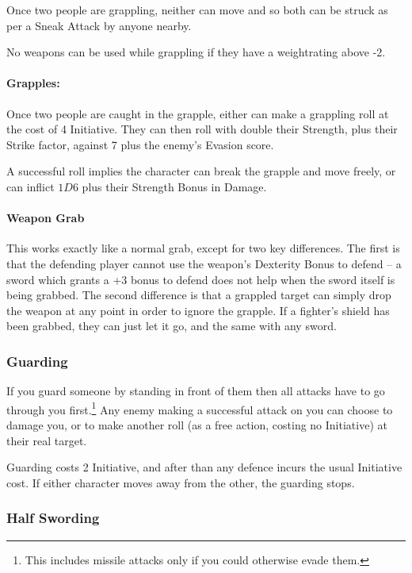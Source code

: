 \begin{multicols}{2}
Once two people are grappling, neither can move and so both can be struck as per a Sneak Attack by anyone nearby.

No weapons can be used while grappling if they have a \gls{weightrating} above -2.

\paragraph{Grapples:}

Once two people are caught in the grapple, either can make a grappling roll at the cost of 4 Initiative.  They can then roll with double their Strength, plus their Strike factor, against 7 plus the enemy's Evasion score.

A successful roll implies the character can break the grapple and move freely, or can inflict $1D6$ plus their Strength Bonus in Damage.

\paragraph{Weapon Grab}

This works exactly like a normal grab, except for two key differences.
The first is that the defending player cannot use the weapon's Dexterity Bonus to defend -- a sword which grants a +3 bonus to defend does not help when the sword itself is being grabbed.
The second difference is that a grappled target can simply drop the weapon at any point in order to ignore the grapple.
If a fighter's shield has been grabbed, they can just let it go, and the same with any sword.

\subsubsection{Guarding}

If you guard someone by standing in front of them then all attacks have to go through you first.\footnote{This includes missile attacks only if you could otherwise evade them.}
Any enemy making a successful attack on you can choose to damage you, or to make another roll (as a free action, costing no Initiative) at their real target.

Guarding costs 2 Initiative, and after than any defence incurs the usual Initiative cost.
If either character moves away from the other, the guarding stops.

\subsubsection{Half Swording}


\end{multicols}
